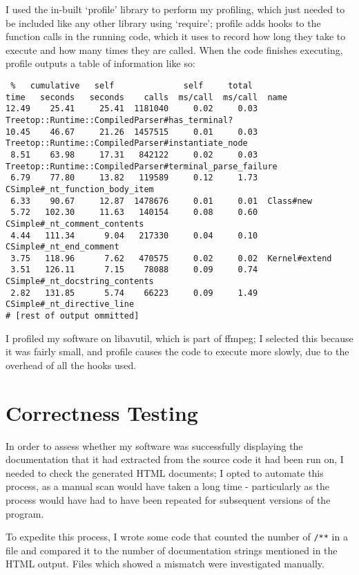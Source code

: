   I used the in-built `profile' library to perform my profiling, which just
  needed to be included like any other library using `require'; profile adds
  hooks to the function calls in the running code, which it uses to record
  how long they take to execute and how many times they are called. When the
  code finishes executing, profile outputs a table of information like so:

\begingroup
    \fontsize{8pt}{12pt}\selectfont
    \begin{verbatim}
 %   cumulative   self              self     total
time   seconds   seconds    calls  ms/call  ms/call  name
12.49    25.41     25.41  1181040     0.02     0.03  Treetop::Runtime::CompiledParser#has_terminal?
10.45    46.67     21.26  1457515     0.01     0.03  Treetop::Runtime::CompiledParser#instantiate_node
 8.51    63.98     17.31   842122     0.02     0.03  Treetop::Runtime::CompiledParser#terminal_parse_failure
 6.79    77.80     13.82   119589     0.12     1.73  CSimple#_nt_function_body_item
 6.33    90.67     12.87  1478676     0.01     0.01  Class#new
 5.72   102.30     11.63   140154     0.08     0.60  CSimple#_nt_comment_contents
 4.44   111.34      9.04   217330     0.04     0.10  CSimple#_nt_end_comment
 3.75   118.96      7.62   470575     0.02     0.02  Kernel#extend
 3.51   126.11      7.15    78088     0.09     0.74  CSimple#_nt_docstring_contents
 2.82   131.85      5.74    66223     0.09     1.49  CSimple#_nt_directive_line
# [rest of output ommitted]
  \end{verbatim}
\endgroup

  I profiled my software on libavutil, which is part of ffmpeg; I selected
  this because it was fairly small, and profile causes the code to execute
  more slowly, due to the overhead of all the hooks used.

\section{Correctness Testing}

In order to assess whether my software was successfully displaying the
documentation that it had extracted from the source code it had been run on, I
needed to check the generated HTML documents; I opted to automate this process,
as a manual scan would have taken a long time - particularly as the process
would have had to have been repeated for subsequent versions of the program.


To expedite this process, I wrote some code that counted the number of
\lstinline|/**|
in a file and compared it to the number of documentation strings mentioned in
the HTML output. Files which showed a mismatch were investigated manually.

